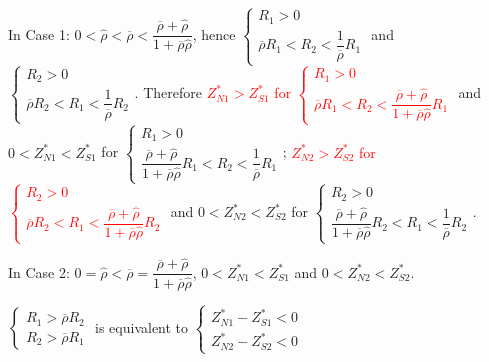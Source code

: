 \documentclass[10pt]{article}
\newcommand{\hhred}{\textcolor{red}}
\begin{document}
In Case 1: $ 0 < {\hat \rho} < \overline{\rho} < \dfrac{\overline{\rho} + {\hat \rho}}{1 + \overline{\rho} {\hat \rho}} $, 
hence $ \left\{ \begin{matrix} R_1 > 0 \\ \overline{\rho} R_1 < R_2 < \dfrac{1}{\overline{\rho}} R_1 \end{matrix} \right. $ and $ \left\{ \begin{matrix} R_2 > 0 \\ \overline{\rho} R_2 < R_1 < \dfrac{1}{\overline{\rho}} R_2 \end{matrix} \right. $.
Therefore \hhred{$ Z_{N 1}^* > Z_{S 1}^* $ for $ \left\{ \begin{matrix} R_1 > 0 \\ \overline{\rho} R_1 < R_2 < \dfrac{\overline{\rho} + {\hat \rho}}{1 + \overline{\rho} {\hat \rho}} R_1 \end{matrix} \right. $} and $ 0 < Z_{N 1}^* < Z_{S 1}^* $ for $ \left\{ \begin{matrix} R_1 > 0 \\ \dfrac{\overline{\rho} + {\hat \rho}}{1 + \overline{\rho} {\hat \rho}} R_1 < R_2 < \dfrac{1}{\overline{\rho}} R_1 \end{matrix} \right. $; 
\hhred{$ Z_{N 2}^* > Z_{S 2}^* $ for $ \left\{ \begin{matrix} R_2 > 0 \\ \overline{\rho} R_2 < R_1 < \dfrac{\overline{\rho} + {\hat \rho}}{1 + \overline{\rho} {\hat \rho}} R_2 \end{matrix} \right. $} and $ 0 < Z_{N 2}^* < Z_{S 2}^* $ for $ \left\{ \begin{matrix} R_2 > 0 \\ \dfrac{\overline{\rho} + {\hat \rho}}{1 + \overline{\rho} {\hat \rho}} R_2 < R_1 < \dfrac{1}{\overline{\rho}} R_2 \end{matrix} \right. $.

In Case 2: $ 0 = {\hat \rho} < \overline{\rho} = \dfrac{\overline{\rho} + {\hat \rho}}{1 + \overline{\rho} {\hat \rho}} $, $ 0 < Z_{N 1}^* < Z_{S 1}^* $ and $ 0 < Z_{N 2}^* < Z_{S 2}^* $.

$ \left\{ \begin{matrix} R_1 > \overline{\rho} R_2 \\ R_2 > \overline{\rho} R_1 \end{matrix} \right. $ is equivalent to $ \left\{ \begin{matrix} Z_{N 1}^* - Z_{S 1}^* < 0 \\ Z_{N 2}^* - Z_{S 2}^* < 0 \end{matrix} \right. $
\end{document}
